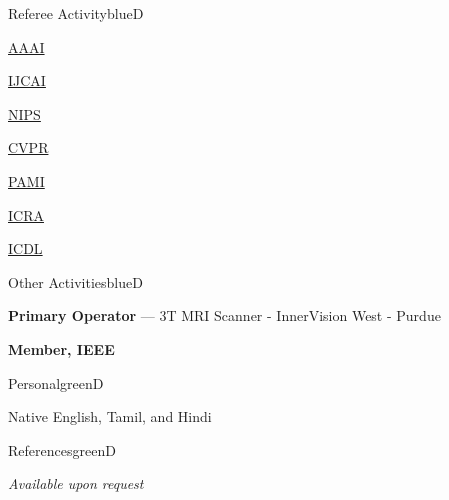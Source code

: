 \documentclass[a4paper]{article}
\def\item{\addtocounter{enumi}{-2}\oldItem}
\begin{document}
\begin{region}{Referee Activity}{blueD}
\item
  \begin{multicols}{8}
    \begin{itemize}
    \item \href{http://www.aaai.org/home.html}{AAAI}
    \item \href{http://ijcai-16.org/}{IJCAI}
    \item \href{http://nips.cc/}{NIPS}
    \item \href{http://www.pamitc.org/cvpr14/}{CVPR}
    \item \href{http://www.computer.org/portal/web/tpami}{PAMI}
    \item \href{http://www.icra2014.com/}{ICRA}
    \item \href{http://www.icdl-epirob.org/}{ICDL}
    \end{itemize}
  \end{multicols}
\end{region}


\begin{region}{Other Activities}{blueD}
\item \textbf{Primary Operator} --- 3T MRI Scanner - InnerVision West - Purdue
\item \textbf{Member, IEEE} %
\end{region}

\begin{region}{Personal}{greenD}
\item Native English, Tamil, and Hindi
\end{region}

\begin{region}{References}{greenD}
\item \textsl{Available upon request}
\end{region}
\end{document}
